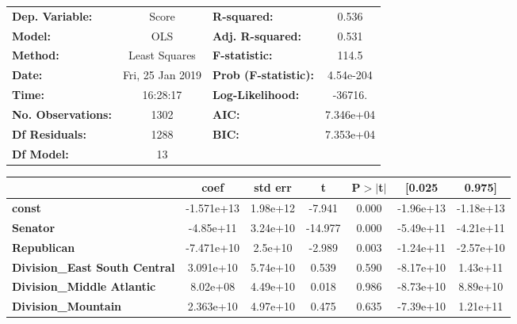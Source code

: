 \begin{center}
\begin{tabular}{lclc}
\toprule
\textbf{Dep. Variable:}               &      Score       & \textbf{  R-squared:         } &     0.536   \\
\textbf{Model:}                       &       OLS        & \textbf{  Adj. R-squared:    } &     0.531   \\
\textbf{Method:}                      &  Least Squares   & \textbf{  F-statistic:       } &     114.5   \\
\textbf{Date:}                        & Fri, 25 Jan 2019 & \textbf{  Prob (F-statistic):} & 4.54e-204   \\
\textbf{Time:}                        &     16:28:17     & \textbf{  Log-Likelihood:    } &   -36716.   \\
\textbf{No. Observations:}            &        1302      & \textbf{  AIC:               } & 7.346e+04   \\
\textbf{Df Residuals:}                &        1288      & \textbf{  BIC:               } & 7.353e+04   \\
\textbf{Df Model:}                    &          13      & \textbf{                     } &             \\
\bottomrule
\end{tabular}
\begin{tabular}{lcccccc}
                                      & \textbf{coef} & \textbf{std err} & \textbf{t} & \textbf{P$>$$|$t$|$} & \textbf{[0.025} & \textbf{0.975]}  \\
\midrule
\textbf{const}                        &   -1.571e+13  &     1.98e+12     &    -7.941  &         0.000        &    -1.96e+13    &    -1.18e+13     \\
\textbf{Senator}                      &    -4.85e+11  &     3.24e+10     &   -14.977  &         0.000        &    -5.49e+11    &    -4.21e+11     \\
\textbf{Republican}                   &   -7.471e+10  &      2.5e+10     &    -2.989  &         0.003        &    -1.24e+11    &    -2.57e+10     \\
\textbf{Division\_East South Central} &    3.091e+10  &     5.74e+10     &     0.539  &         0.590        &    -8.17e+10    &     1.43e+11     \\
\textbf{Division\_Middle Atlantic}    &     8.02e+08  &     4.49e+10     &     0.018  &         0.986        &    -8.73e+10    &     8.89e+10     \\
\textbf{Division\_Mountain}           &    2.363e+10  &     4.97e+10     &     0.475  &         0.635        &    -7.39e+10    &     1.21e+11     \\

\end{tabular}
\end{center}
